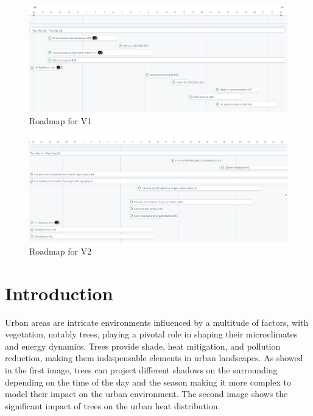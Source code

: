 \documentclass[12pt]{article}
\begin{document}
\begin{figure}[H]
    \centering
    \includegraphics[width=1\textwidth]{images/roadmap_v1.png}
    \caption{Roadmap for V1}
\end{figure}

\begin{figure}[H]
    \centering
    \includegraphics[width=1\textwidth]{images/roadmap_v2.png}
    \caption{Roadmap for V2}
\end{figure}

\newpage

\section{Introduction}
Urban areas are intricate environments influenced by a multitude of factors, with 
vegetation, notably trees, playing a pivotal role in shaping their microclimates 
and energy dynamics. Trees provide shade, heat mitigation, and pollution reduction,
making them indispensable elements in urban landscapes\cite{TIR4sTREEt,img:TreeShade}. As showed in the first image, trees can project different shadows
on the surrounding depending on the time of the day and the season making it 
more complex to model their impact on the urban environment. The second image
shows the significant impact of trees on the urban heat distribution.
\end{document}
